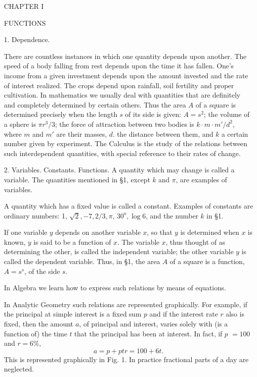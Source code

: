 \documentclass[12pt]{article}
\begin{document}
\begin{center}
CHAPTER I  
\end{center}
\begin{center}
FUNCTIONS
\end{center}

1. Dependence.

There are countless instances in which one
quantity depends upon another. The speed of a body falling
from rest depends upon the time it has fallen. One's income
from a given investment depends upon the amount invested
and the rate of interest realized. The crops depend upon rainfall, 
soil fertility and proper cultivation.
In mathematics we usually deal with quantities that are
definitely and completely determined by certain others. Thus
the area $A$ of a square is determined precisely when the length
$s$ of its side is given: $A=s^{2}$; the volume of a sphere is $\pi r^3/3$;
the force of attraction between two bodies is $ k\cdot m\cdot m'/ d^2$, where
$m$ and $m'$ are their masses, $d$. the distance between them, and $k$
a certain number given by experiment. The Calculus is the
study of the relations between such interdependent quantities,
with special reference to their rates of change.

2. Variables. Constants. Functions. A quantity which
may change is called a variable. The quantities mentioned in
\S 1, except $k$ and $\pi$, are examples of variables.

A quantity which has a fixed value is called a constant. Examples 
of constants are ordinary numbers: 1, $\sqrt{2}, -7,2/3, \pi$,
$30^{\mathrm{o}}, \log 6$, and the number $k$ in \S 1.

If one variable $y$ depends on another variable $x$, so that $y$ is
determined when $x$ is known, $y$ is said to be a function of $x$.
The variable $x$, thus thought of as determining the other, is
called the independent variable; the other variable $y$ is called
the dependent variable. Thus, in \S 1, the
area $A$ of a square is a function, $A=s^s$, of
the side $s$.

In Algebra we learn how to express such
relations by means of equations.


In Analytic Geometry such relations are
represented graphically. For example, if
the principal at simple interest is a fixed
sum $p$ and if the interest rate $r$ also is
fixed, then the amount $a$, of principal and
interest, varies solely with (is a function of)
the time $t$ that the principal has been at interest. In fact, if $p$
$=100$ and $ r=6\%$,
$$
a=p+ptr=100+6t.
$$
This is represented graphically in Fig. 1. In practice fractional
parts of a day are neglected.
\end{document}
